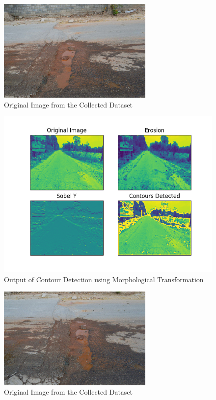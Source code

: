 \documentclass[12pt,a4paper]{article}
\begin{document}
\begin{itemize}
    \begin{figure}[ht!]
        \centering
        \includegraphics[width = 3in]{images/road_cam_2.jpg}
        \caption{Original Image from the Collected Dataset}
    \end{figure}

    \begin{figure}[ht!]
        \centering
        \includegraphics[width = 5in]{images/morph_transform_4.png}
        \caption{Output of Contour Detection using Morphological Transformation}
    \end{figure}
    \pagebreak
    
    \begin{figure}[ht!]
        \centering
        \includegraphics[width = 3in]{images/road_cam_6.jpg}
        \caption{Original Image from the Collected Dataset}
    \end{figure}


\end{itemize}
\end{document}
